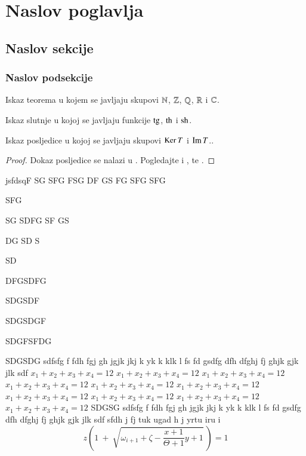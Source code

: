 \documentclass[a4paper,twoside,12pt]{memoir} %
\begin{document}
\chapter[Naslov poglavlja u sadržaju][Kratki naslov poglavlja]{Naslov poglavlja}	

\section[Naslov sekcije u sadržaju][Kratki naslov sekcije]{Naslov sekcije}
\subsection{Naslov podsekcije}
\begin{thm}
Iskaz teorema u kojem se javljaju skupovi  $\mathbb{N}$, $\mathbb{Z}$, $\mathbb{Q}$, $\mathbb{R}$ i $\mathbb{C}$.
\end{thm}
\begin{conj}
Iskaz slutnje u kojoj se javljaju funkcije $\operatorname{tg}$, $\operatorname{th}$ i $\operatorname{sh}$.
\end{conj}
\begin{cor}
Iskaz posljedice u kojoj se javljaju skupovi $\operatorname{Ker} T$ i $\operatorname{Im} T$..
\end{cor}
\begin{proof}
Dokaz posljedice se nalazi u \cite{kljuc}. Pogledajte i \cite{kurepa1956convex}, \cite{kurepa1981funkcionalna} te \cite{Dutkay:2009}.
\end{proof}
jsfdsqF
SG
SFG
FSG
DF
GS
FG
SFG
SFG

SFG

SG
SDFG
SF
GS

DG
 SD
S


SD
 

DFGSDFG


SDGSDF


SDGSDGF


SDGFSFDG


SDGSDG  sdfsfg f fdh fgj gh jgjk jkj k yk k klk l fs fd gsdfg dfh dfghj fj ghjk gjk jlk sdf 
$x_1+x_2+x_3+x_4=12$ $x_1+x_2+x_3+x_4=12$
 $x_1+x_2+x_3+x_4=12$ $x_1+x_2+x_3+x_4=12$ $x_1+x_2+x_3+x_4=12$ $x_1+x_2+x_3+x_4=12$
 $x_1+x_2+x_3+x_4=12$ $x_1+x_2+x_3+x_4=12$ $x_1+x_2+x_3+x_4=12$
$x_1+x_2+x_3+x_4=12$ 
SDGSG sdfsfg f fdh fgj gh jgjk jkj k yk k klk l fs fd gsdfg dfh dfghj fj ghjk gjk jlk sdf sfdh j fj tuk ugad h j yrtu iru i
\[ z \left( 1 \ +\ \sqrt{\omega_{i+1} + \zeta -\frac{x+1}{\Theta +1} y + 1}
\ \right) =  1 \]
\end{document}
